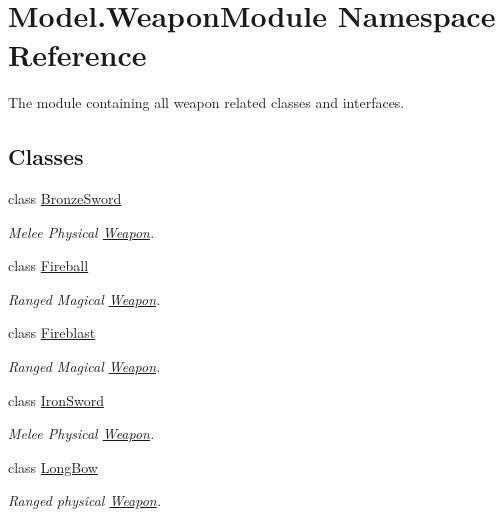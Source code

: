 \hypertarget{namespace_model_1_1_weapon_module}{}\section{Model.\+Weapon\+Module Namespace Reference}
\label{namespace_model_1_1_weapon_module}


The module containing all weapon related classes and interfaces.  


\subsection*{Classes}
\begin{DoxyCompactItemize}
\item 
class \hyperlink{class_model_1_1_weapon_module_1_1_bronze_sword}{Bronze\+Sword}
\begin{DoxyCompactList}\small\item\em Melee Physical \hyperlink{interface_model_1_1_weapon_module_1_1_weapon}{Weapon}. \end{DoxyCompactList}\item 
class \hyperlink{class_model_1_1_weapon_module_1_1_fireball}{Fireball}
\begin{DoxyCompactList}\small\item\em Ranged Magical \hyperlink{interface_model_1_1_weapon_module_1_1_weapon}{Weapon}. \end{DoxyCompactList}\item 
class \hyperlink{class_model_1_1_weapon_module_1_1_fireblast}{Fireblast}
\begin{DoxyCompactList}\small\item\em Ranged Magical \hyperlink{interface_model_1_1_weapon_module_1_1_weapon}{Weapon}. \end{DoxyCompactList}\item 
class \hyperlink{class_model_1_1_weapon_module_1_1_iron_sword}{Iron\+Sword}
\begin{DoxyCompactList}\small\item\em Melee Physical \hyperlink{interface_model_1_1_weapon_module_1_1_weapon}{Weapon}. \end{DoxyCompactList}\item 
class \hyperlink{class_model_1_1_weapon_module_1_1_long_bow}{Long\+Bow}
\begin{DoxyCompactList}\small\item\em Ranged physical \hyperlink{interface_model_1_1_weapon_module_1_1_weapon}{Weapon}. \end{DoxyCompactList}\item 

\end{DoxyCompactItemize}
